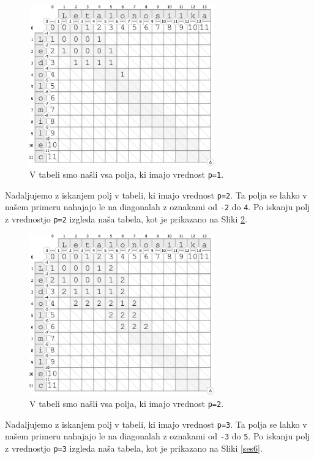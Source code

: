 \documentclass[a4paper, 12pt, twoside]{book}
\begin{document}
\begin{figure}[placement h]
\begin{center}
\includegraphics[width=8cm]{img/ses4.pdf}
\end{center}
\caption{V tabeli smo našli vsa polja, ki imajo vrednost {\tt p=1}.}
\label{ses4}
\end{figure}

Nadaljujemo z iskanjem polj v tabeli, ki imajo vrednost {\tt p=2}. Ta polja se lahko v našem primeru nahajajo le na diagonalah z oznakami od {\tt -2} do {\tt 4}. Po iskanju polj z vrednostjo {\tt p=2} izgleda naša tabela, kot je prikazano na Sliki \ref{ses5}.

\begin{figure}[placement h]
\begin{center}
\includegraphics[width=8cm]{img/ses5.pdf}
\end{center}
\caption{V tabeli smo našli vsa polja, ki imajo vrednost {\tt p=2}.}
\label{ses5}
\end{figure}

\pagebreak

Nadaljujemo z iskanjem polj v tabeli, ki imajo vrednost {\tt p=3}. Ta polja se lahko v našem primeru nahajajo le na diagonalah z oznakami od {\tt -3} do {\tt 5}. Po iskanju polj z vrednostjo {\tt p=3} izgleda naša tabela, kot je prikazano na Sliki \ref{ses6}.
\end{document}
